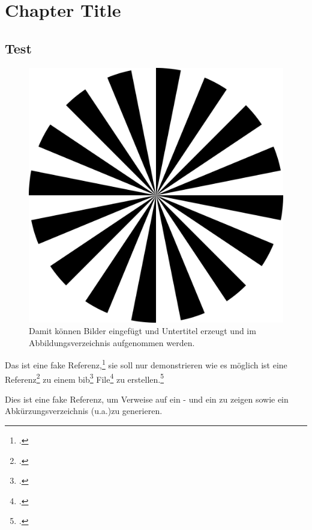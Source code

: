 \chapter{Chapter Title}

\Blindtext

\section{Test}
\begin{figure}
  \includegraphics[width=\textwidth]{figures/testbild.png}
  \caption{Damit können Bilder eingefügt und Untertitel erzeugt und im Abbildungsverzeichnis aufgenommen werden.}
\end{figure}

Das ist eine fake Referenz,\footcite{Muster3} sie soll nur demonstrieren wie es möglich ist eine Referenz\footcite{Muster2} zu einem bib\footcite{Muster8} File\footcite{Muster6} zu erstellen.\footcite{Muster1}

Dies ist eine fake Referenz, um Verweise auf ein - und ein  zu zeigen sowie ein Abkürzungsverzeichnis (\gls{u.a.})zu generieren.  

